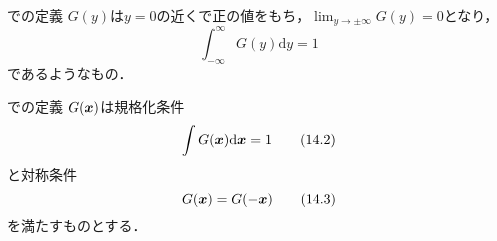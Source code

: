 \documentclass[12pt,a4paper]{jsarticle}
\def\vector#1{\mbox{\boldmath $#1$}}
\begin{document}
\begin{itembox}[l]{\cite{Kajishima}での定義}
  $G(y)$は$y=0$の近くで正の値をもち，$\displaystyle{\lim_{y \to \pm \infty} G(y) = 0}$となり，
  \begin{equation}
    \int_{-\infty}^\infty G(y) \mathrm{d}y =1 \tag{7.7}
    \label{eq:RegularofFilterFunctionKajishima}
  \end{equation}
  であるようなもの．
\end{itembox}
\begin{itembox}[l]{\cite{KidaYanase}での定義}
  $G(\vector{x})$は規格化条件
  \begin{equation}
    \int G(\vector{x}) \mathrm{d}\vector{x} =1 \tag{14.2}
    \label{eq:RegularofFilterFunctionKidaYanase}
  \end{equation}
  と対称条件
  \begin{equation}
    G(\vector{x}) =G(-\vector{x}) \tag{14.3}
    \label{eq:SymmetryofFilterFunctionKidaYanase}
  \end{equation}
  を満たすものとする．
\end{itembox}\\
\end{document}
